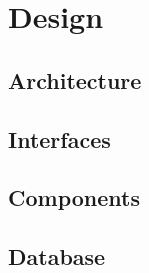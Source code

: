 \chapter{Design}\label{part:design}





\section{Architecture}
 
\section{Interfaces}
 
\section{Components}
 
\section{Database}
 

